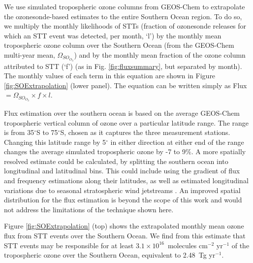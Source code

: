   We use simulated tropospheric ozone columns from GEOS-Chem to extrapolate the ozonesonde-based estimates to the entire Southern Ocean region. 
  To do so, we multiply the monthly likelihoods of STTs (fraction of ozonesonde releases for which an STT event was detected, per month, `l') by the monthly mean tropospheric ozone column over the Southern Ocean (from the GEOS-Chem multi-year mean, $\Omega_{SO_{O_3}}$) and by the monthly mean fraction of the ozone column attributed to STT (`f') (as in Fig. \ref{fig:fluxsummary}, but separated by month).
  The monthly values of each term in this equation are shown in Figure \ref{fig:SOExtrapolation} (lower panel).
  The equation can be written simply as Flux$= \Omega_{SO_{O_3}} \times f \times l$.

  Flux estimation over the southern ocean is based on the average GEOS-Chem tropospheric vertical column of ozone over a particular latitude range.
  The range is from 35$^{\circ}$S to 75$^{\circ}$S, chosen as it captures the three measurement stations.
  Changing this latitude range by 5$^{\circ}$ in either direction at either end of the range changes the average simulated tropospheric ozone by -7 to 9\%.
  A more spatially resolved estimate could be calculated, by splitting the southern ocean into longitudinal and latitudinal bins.
  This could include using the gradient of flux and frequency estimations along their latitudes, as well as estimated longitudinal variations due to seasonal stratospheric wind jetstreams \citep{Baray2012}.
  An improved spatial distribution for the flux estimation is beyond the scope of this work and would not address the limitations of the technique shown here.
  
  Figure \ref{fig:SOExtrapolation} (top) shows the extrapolated monthly mean ozone flux from STT events over the Southern Ocean.
  We find from this estimate that STT events may be responsible for at least $3.1 \times10^{16}$~molecules cm$^{-2}$ yr$^{-1}$ of the tropospheric ozone over the Southern Ocean, equivalent to 2.48~Tg yr$^{-1}$.
    
  \begin{figure*}[t]
    \caption{(Top) Estimated contribution of STT to tropospheric ozone columns over the Southern Ocean.
      (Bottom) The three quantities used to calculate (as per the text) the flux estimates shown in the top panel.
      The tropospheric ozone column $\Omega_{SO_{O_3}}$ (black, left axis) is from GEOS-Chem, while the STT fraction $f$ (blue, right axis) and likelihood $l$ (purple, right axis) are from the ozonesonde measurements.
      The STT fraction is multiplied by 3 to show the seasonality.}
    \label{fig:SOExtrapolation}
  \end{figure*}
  
